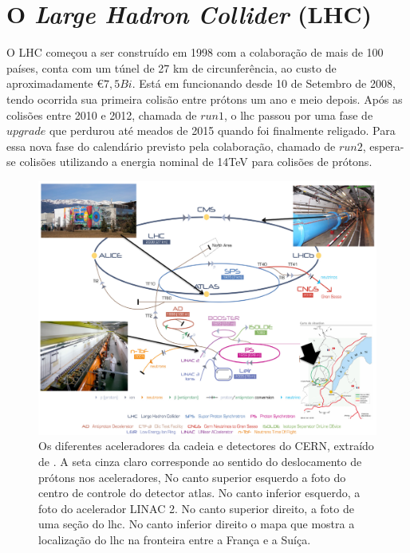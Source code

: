 \section{O \emph{Large Hadron Collider} (LHC)}

O LHC começou a ser construído em 1998 com a colaboração de mais de 100 países, conta com um 
túnel de 27 km de circunferência, ao custo de aproximadamente  \euro $7,5 Bi$. Está em funcionando 
desde 10 de Setembro de 2008, tendo ocorrida sua primeira colisão entre prótons um ano e meio depois. Após as 
colisões entre 2010 e 2012, chamada de $run 1$, o \gls{lhc} passou por uma fase de $upgrade$
que perdurou até meados de 2015 quando foi finalmente religado. Para essa nova fase do calendário previsto
pela colaboração, chamado de $run 2$, espera-se colisões utilizando a energia nominal de 14TeV para
colisões de prótons.

\begin{figure}[h!t]
\centering
\includegraphics[width=\textwidth]{figures/lhc-overview.pdf}
\caption[A cadeia de aceleração do LHC]{
Os diferentes aceleradores da cadeia e detectores do CERN, extraído de
\cite{cern_accelerators}. A seta cinza claro corresponde ao sentido do
deslocamento de prótons nos aceleradores, No canto superior esquerdo
a foto do centro de controle do detector \gls{atlas}. No canto inferior esquerdo, a
foto do acelerador LINAC 2. No canto superior direito, a foto de uma seção do \gls{lhc}.
No canto inferior direito o mapa que mostra a localização do  \gls{lhc} na fronteira entre
a França e a Suíça.}
\label{fig:esquema_aceleradores}
\end{figure}

